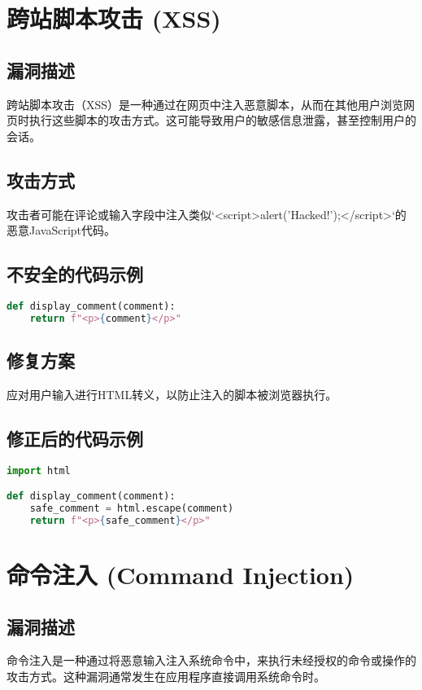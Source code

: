 \documentclass{article}
\begin{document}
\section{跨站脚本攻击 (XSS)}

\subsection{漏洞描述}
跨站脚本攻击（XSS）是一种通过在网页中注入恶意脚本，从而在其他用户浏览网页时执行这些脚本的攻击方式。这可能导致用户的敏感信息泄露，甚至控制用户的会话。

\subsection{攻击方式}
攻击者可能在评论或输入字段中注入类似`<script>alert('Hacked!');</script>`的恶意JavaScript代码。

\subsection{不安全的代码示例}
\begin{lstlisting}[language=Python, caption=存在XSS漏洞的代码]
def display_comment(comment):
    return f"<p>{comment}</p>"
\end{lstlisting}

\subsection{修复方案}
应对用户输入进行HTML转义，以防止注入的脚本被浏览器执行。

\subsection{修正后的代码示例}
\begin{lstlisting}[language=Python, caption=经过HTML转义的安全代码]
import html

def display_comment(comment):
    safe_comment = html.escape(comment)
    return f"<p>{safe_comment}</p>"
\end{lstlisting}

\section{命令注入 (Command Injection)}

\subsection{漏洞描述}
命令注入是一种通过将恶意输入注入系统命令中，来执行未经授权的命令或操作的攻击方式。这种漏洞通常发生在应用程序直接调用系统命令时。
\end{document}

